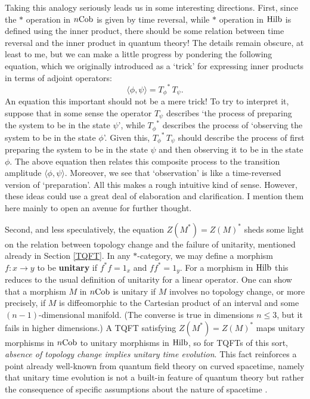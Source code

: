 \documentclass{article}
\newcommand{\Hilb}{{\rm Hilb}}
\newcommand{\Cob}{{\rm Cob}}
\renewcommand{\to}{\rightarrow}
\newcommand{\maps}{\colon}
\begin{document}
Taking this analogy seriously leads us in some interesting directions.
First, since the $\ast$ operation in $n\Cob$ is given by time
reversal, while $\ast$ operation in $\Hilb$ is defined using the inner
product, there should be some relation between time reversal and the
inner product in quantum theory!  The details remain obscure, at least
to me, but we can make a little progress by pondering the following
equation, which we originally introduced as a `trick' for expressing
inner products in terms of adjoint operators:
\[        \langle \phi,\psi \rangle = {T_\phi}^{\!\!\ast} \, T_\psi . \]
An equation this important should not be a mere trick!  To try to
interpret it, suppose that in some sense the operator $T_\psi$
describes `the process of preparing the system to be in the state
$\psi$', while ${T_\phi}^{\!\!\ast}$ describes the process of
`observing the system to be in the state $\phi$'.  Given this,
${T_\phi}^{\!\!\ast} \, T_\psi$ should describe the process of first
preparing the system to be in the state $\psi$ and then observing it
to be in the state $\phi$.  The above equation then relates this
composite process to the transition amplitude $\langle \phi, \psi
\rangle$.  Moreover, we see that `observation' is like a time-reversed
version of `preparation'.  All this makes a rough intuitive kind of
sense.  However, these ideas could use a great deal of elaboration and
clarification.  I mention them here mainly to open an avenue for
further thought.

Second, and less speculatively, the equation $Z(M^\ast) = Z(M)^\ast$
sheds some light on the relation between topology change and the
failure of unitarity, mentioned already in Section \ref{TQFT}.  In any
$\ast$-category, we may define a morphism $f \maps x \to y$ to be {\bf
unitary} if $f^\ast f = 1_x$ and $ff^\ast = 1_y$.  For a morphism in
$\Hilb$ this reduces to the usual definition of unitarity for a linear
operator.  One can show that a morphism $M$ in $n\Cob$ is unitary if 
$M$ involves no topology change, or more precisely, if $M$ is diffeomorphic 
to the Cartesian product of an interval and some $(n-1)$-dimensional manifold.  
(The converse is true in dimensions $n \le 3$, but it fails in higher 
dimensions.)  A TQFT satisfying $Z(M^\ast) = Z(M)^\ast$ maps
unitary morphisms in $n\Cob$ to unitary morphisms in $\Hilb$, so
for TQFTs of this sort, {\it absence of topology change
implies unitary time evolution}.  This fact reinforces a point already 
well-known from quantum field theory on curved spacetime, namely that 
unitary time evolution is not a built-in feature of quantum theory 
but rather the consequence of specific assumptions about the nature 
of spacetime \cite{Earman}.
\end{document}

